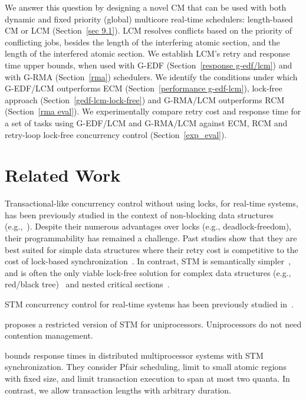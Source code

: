 \documentclass[conference]{sig-alternate}
\begin{document}
We answer this question by designing a novel CM that can be used with both dynamic and fixed priority (global) multicore real-time schedulers: length-based CM or LCM (Section~\ref{sec 9.1}). LCM resolves conflicts based on the priority of conflicting jobs, besides the length of the interfering atomic section, and the length of the interfered atomic section.  We establish LCM's retry and response time upper bounds, when used with G-EDF (Section~\ref{response g-edf/lcm}) and with G-RMA (Section~\ref{rma}) schedulers. We identify the conditions under which G-EDF/LCM outperforms ECM (Section~\ref{performance g-edf-lcm}), lock-free approach (Section~\ref{gedf-lcm-lock-free}) and G-RMA/LCM outperforms RCM (Section~\ref{rma eval}). We experimentally compare retry cost and response time for a set of tasks using G-EDF/LCM and G-RMA/LCM against ECM, RCM and retry-loop lock-free concurrency control (Section~\ref{exp_eval}).

\section{Related Work}
\label{sec:past}

Transactional-like concurrency control without using locks, for real-time systems, has been previously studied in the context of non-blocking data structures (e.g.,~\cite{anderson95realtime}). Despite their numerous advantages over locks 
(e.g., deadlock-freedom), 
their programmability has remained a challenge. 
Past studies show that they are best suited for simple data structures where their retry cost is competitive to the cost of lock-based synchronization~\cite{bc+08}.  In contrast, STM is semantically simpler~\cite{Herlihy:2006:AMP:1146381.1146382}, and is often the only viable lock-free solution for complex data structures (e.g., red/black tree)~\cite{key-1} and nested critical sections~\cite{Saha:2006:MHP:1122971.1123001}.

STM concurrency control for real-time systems has been previously studied in~\cite{manson2006preemptible,fahmy2009bounding,sarni2009real,schoeberl2010rttm,key-1,barrosmanaging,stmconcurrencycontrol:emsoft11}.


\cite{manson2006preemptible} proposes a restricted version of STM for uniprocessors. Uniprocessors do not need contention management.

\cite{fahmy2009bounding} bounds response times in distributed multiprocessor systems with STM synchronization. They consider Pfair scheduling, limit to small atomic regions with fixed size, and limit transaction execution to span at most two quanta. In contrast, we allow transaction lengths 
with  arbitrary duration. 
\end{document}
